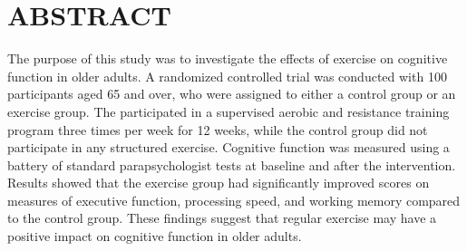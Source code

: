\chapter*{\centering ABSTRACT}

The purpose of this study was to investigate the effects of exercise on cognitive function in older adults. A randomized controlled trial was conducted with 100 participants aged 65 and over, who were assigned to either a control group or an exercise group. The participated in a supervised aerobic and resistance training program three times per week for 12 weeks, while the control group did not participate in any structured exercise. Cognitive function was measured using a battery of standard parapsychologist tests at baseline and after the intervention. Results showed that the exercise group had significantly improved scores on measures of executive function, processing speed, and working memory compared to the control group. These findings suggest that regular exercise may have a positive impact on cognitive function in older adults. \\
